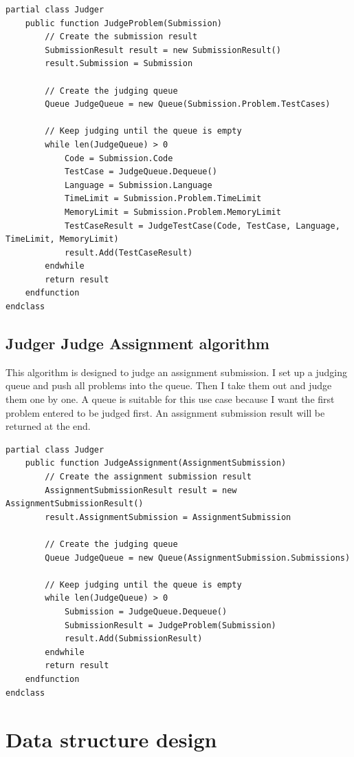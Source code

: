 \documentclass[a4paper]{report}
\begin{document}
\begin{verbatim}
partial class Judger
    public function JudgeProblem(Submission)
        // Create the submission result
        SubmissionResult result = new SubmissionResult()
        result.Submission = Submission

        // Create the judging queue
        Queue JudgeQueue = new Queue(Submission.Problem.TestCases)

        // Keep judging until the queue is empty
        while len(JudgeQueue) > 0
            Code = Submission.Code
            TestCase = JudgeQueue.Dequeue()
            Language = Submission.Language
            TimeLimit = Submission.Problem.TimeLimit
            MemoryLimit = Submission.Problem.MemoryLimit
            TestCaseResult = JudgeTestCase(Code, TestCase, Language, TimeLimit, MemoryLimit)
            result.Add(TestCaseResult)
        endwhile
        return result
    endfunction
endclass
\end{verbatim}

\subsection{Judger Judge Assignment algorithm}

This algorithm is designed to judge an assignment submission. I set up a judging queue and push all problems into the queue. Then I take them out and judge them one by one. A queue is suitable for this use case because I want the first problem entered to be judged first. An assignment submission result will be returned at the end.

\begin{verbatim}
partial class Judger
    public function JudgeAssignment(AssignmentSubmission)
        // Create the assignment submission result
        AssignmentSubmissionResult result = new AssignmentSubmissionResult()
        result.AssignmentSubmission = AssignmentSubmission

        // Create the judging queue
        Queue JudgeQueue = new Queue(AssignmentSubmission.Submissions)

        // Keep judging until the queue is empty
        while len(JudgeQueue) > 0
            Submission = JudgeQueue.Dequeue()
            SubmissionResult = JudgeProblem(Submission)
            result.Add(SubmissionResult)
        endwhile
        return result
    endfunction
endclass
\end{verbatim}

\section{Data structure design}
\end{document}
